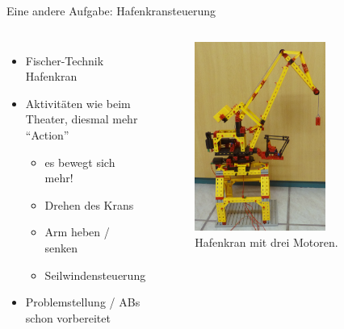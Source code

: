 \documentclass[usenames,dvipsnames]{beamer}
\begin{document}
\begin{frame}{Eine andere Aufgabe: Hafenkransteuerung}
	\begin{columns}[t]
		\begin{itemize}
			\item Fischer-Technik Hafenkran
			\item Aktivitäten wie beim Theater, diesmal mehr \enquote{Action}
			\begin{itemize}
				\item es bewegt sich mehr!
				\item Drehen des Krans
				\item Arm heben / senken
				\item Seilwindensteuerung
			\end{itemize}
			\item Problemstellung / ABs schon vorbereitet
		\end{itemize}

		\begin{figure}[t]
			\centering
			\includegraphics[width=0.7\textwidth]{img/kran}
			\caption{Hafenkran mit drei Motoren.}
		\end{figure}
	\end{columns}
\end{frame}
\end{document}
